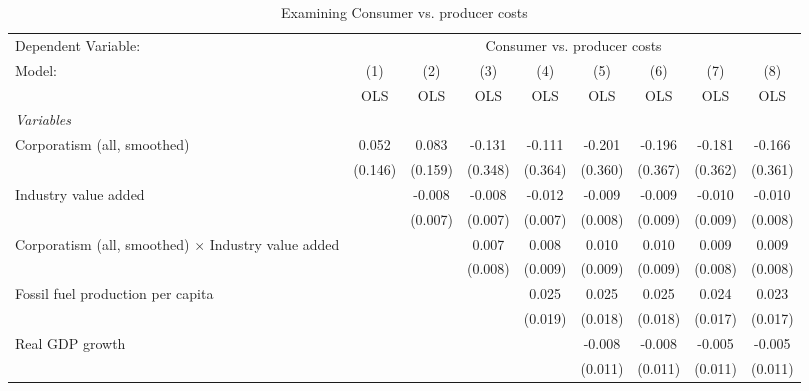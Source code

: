
\begin{table}[htbp]
   \caption{Examining Consumer vs. producer costs}
   \centering
   \begin{tabular}{lcccccccc}
      \toprule
      Dependent Variable: & \multicolumn{8}{c}{Consumer vs. producer costs}\\
      Model:                                                     & (1)     & (2)     & (3)     & (4)     & (5)     & (6)     & (7)     & (8)\\  
                                                                 &  OLS    & OLS     & OLS     & OLS     & OLS     & OLS     & OLS     & OLS\\  
      \midrule
      \emph{Variables}\\
      Corporatism (all, smoothed)                                & 0.052   & 0.083   & -0.131  & -0.111  & -0.201  & -0.196  & -0.181  & -0.166\\   
                                                                 & (0.146) & (0.159) & (0.348) & (0.364) & (0.360) & (0.367) & (0.362) & (0.361)\\   
      Industry value added                                       &         & -0.008  & -0.008  & -0.012  & -0.009  & -0.009  & -0.010  & -0.010\\   
                                                                 &         & (0.007) & (0.007) & (0.007) & (0.008) & (0.009) & (0.009) & (0.008)\\   
      Corporatism (all, smoothed) $\times$ Industry value added  &         &         & 0.007   & 0.008   & 0.010   & 0.010   & 0.009   & 0.009\\   
                                                                 &         &         & (0.008) & (0.009) & (0.009) & (0.009) & (0.008) & (0.008)\\   
      Fossil fuel production per capita                          &         &         &         & 0.025   & 0.025   & 0.025   & 0.024   & 0.023\\   
                                                                 &         &         &         & (0.019) & (0.018) & (0.018) & (0.017) & (0.017)\\   
      Real GDP growth                                            &         &         &         &         & -0.008  & -0.008  & -0.005  & -0.005\\   
                                                                 &         &         &         &         & (0.011) & (0.011) & (0.011) & (0.011)\\   

\end{tabular}
\end{table}
